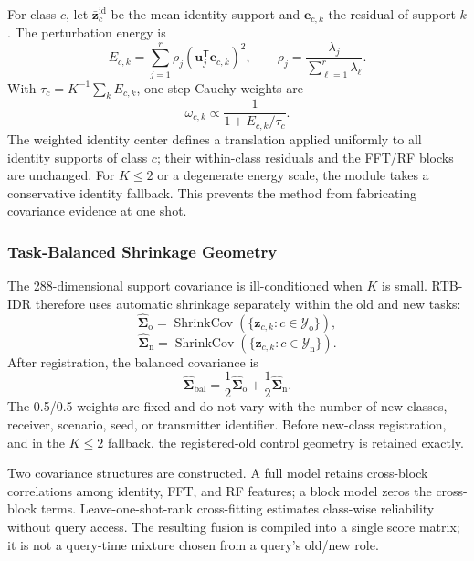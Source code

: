 \documentclass[journal]{IEEEtran}
\newcommand{\stagehead}{RTB-IDR}
\newcommand{\Yold}{\mathcal{Y}_{\mathrm{o}}}
\newcommand{\Ynew}{\mathcal{Y}_{\mathrm{n}}}
\begin{document}
For class \(c\), let \(\bar{\mathbf{z}}_{c}^{\mathrm{id}}\) be the mean identity support and \(\mathbf{e}_{c,k}\) the residual of support \(k\). The perturbation energy is
\begin{equation}
E_{c,k} =
\sum_{j=1}^{r}\rho_j
\left(\mathbf{u}_{j}^{\mathsf T}\mathbf{e}_{c,k}\right)^2,
\qquad
\rho_j=\frac{\lambda_j}{\sum_{\ell=1}^{r}\lambda_\ell}.
\end{equation}
With \(\tau_c=K^{-1}\sum_k E_{c,k}\), one-step Cauchy weights are
\begin{equation}
\omega_{c,k}\propto
\frac{1}{1+E_{c,k}/\tau_c}.
\end{equation}
The weighted identity center defines a translation applied uniformly to all identity supports of class \(c\); their within-class residuals and the FFT/RF blocks are unchanged. For \(K\leq2\) or a degenerate energy scale, the module takes a conservative identity fallback. This prevents the method from fabricating covariance evidence at one shot.

\subsubsection{Task-Balanced Shrinkage Geometry}

The 288-dimensional support covariance is ill-conditioned when \(K\) is small. \stagehead{} therefore uses automatic shrinkage \cite{ledoit2004covariance} separately within the old and new tasks:
\begin{equation}
\widehat{\boldsymbol{\Sigma}}_{\mathrm{o}} =
\operatorname{ShrinkCov}(\{\mathbf{z}_{c,k}:c\in\Yold\}),
\end{equation}
\begin{equation}
\widehat{\boldsymbol{\Sigma}}_{\mathrm{n}} =
\operatorname{ShrinkCov}(\{\mathbf{z}_{c,k}:c\in\Ynew\}).
\end{equation}
After registration, the balanced covariance is
\begin{equation}
\widehat{\boldsymbol{\Sigma}}_{\mathrm{bal}} =
\frac{1}{2}\widehat{\boldsymbol{\Sigma}}_{\mathrm{o}}
+\frac{1}{2}\widehat{\boldsymbol{\Sigma}}_{\mathrm{n}}.
\label{eq:balanced}
\end{equation}
The 0.5/0.5 weights are fixed and do not vary with the number of new classes, receiver, scenario, seed, or transmitter identifier. Before new-class registration, and in the \(K\leq2\) fallback, the registered-old control geometry is retained exactly.

Two covariance structures are constructed. A full model retains cross-block correlations among identity, FFT, and RF features; a block model zeros the cross-block terms. Leave-one-shot-rank cross-fitting estimates class-wise reliability without query access. The resulting fusion is compiled into a single score matrix; it is not a query-time mixture chosen from a query's old/new role.
\end{document}
